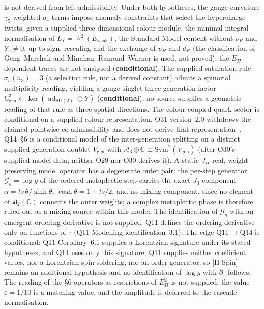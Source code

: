 \documentclass[11pt,a4paper]{article}
\newcommand{\SU}{\mathrm{SU}}
\newcommand{\scond}{\textcolor{ccond}{\textbf{conditional}}}
\begin{document}
    is not derived from left-admissibility.
    Under both hypotheses, the gauge-curvature $\gamma_5$-weighted $a_4$ terms impose anomaly constraints
    that select the hypercharge twists, given a supplied three-dimensional colour module, the minimal integral
    normalisation of $L_Y = \wedge^2(E_{\mathrm{weak}})$, the Standard Model content without $\nu_R$ and $Y_e \neq 0$,
    up to sign, rescaling and the exchange of $u_R$ and $d_R$
    (the classification of Geng--Marshak and Minahan--Ramond--Warner is used, not proved);
    the $E_\Pi$-dependent traces are not analysed (\scond).
    The supplied saturation rule $\sigma_c(n_3) = 3$ (a selection rule, not a derived constant)
    admits a spinorial multiplicity reading, yielding a gauge-singlet three-generation factor
    $\mathbb{C}^3_{\mathrm{gen}} \subset \ker(\operatorname{ad}_{\SU(2)} \oplus Y)$ (\scond); no source
    supplies a geometric reading of that rule as three spatial directions.
    The colour-coupled quark sector is conditional on a supplied colour representation.
    O31 version~2.0 withdraws the claimed pointwise co-admissibility and does not derive that
    representation~\cite{Beau2026a35}.
    Q14~\S6 is a conditional model of the inter-generation splitting on a distinct supplied generation
    doublet $V_{\mathrm{gen}}$ with $\mathcal{A}_3 \otimes \mathbb{C} \cong \mathrm{Sym}^2(V_{\mathrm{gen}})$
    (after O30's supplied model data; neither O29 nor O30 derives it).
    A static $J_\Pi$-real, weight-preserving model operator has a degenerate outer pair; the per-step
    generator $\mathcal{G}_g = \log g$ of the ordered metaplectic step carries the exact $J_3$ component
    $\alpha = ts\,\theta/\sinh\theta$, $\cosh\theta = 1 + ts/2$, and no mixing component, since no element
    of $\mathfrak{sl}_2(\mathbb{C})$ connects the outer weights; a complex metaplectic phase is therefore
    ruled out as a mixing source within this model.
    The identification of $\mathcal{G}_g$ with an emergent ordering derivative is not supplied: Q11
    defines the ordering derivative only on functions of $\tau$ (Q11 Modelling identification~3.1).
    The edge Q11$\to$Q14 is conditional: Q11 Corollary~6.1 supplies a Lorentzian signature under its
    stated hypotheses, and Q14 uses only this signature; Q11 supplies neither coefficient values, nor a
    Lorentzian spin soldering, nor an order generator, so [H-Spin] remains an additional hypothesis and no
    identification of $\log g$ with $\partial_\tau$ follows.
    The reading of the \S6 operators as restrictions of $E_\Pi^2$ is not supplied; the value
    $\varepsilon = 1/10$ is a matching value, and the amplitude is deferred to the cascade normalisation.
\end{document}
